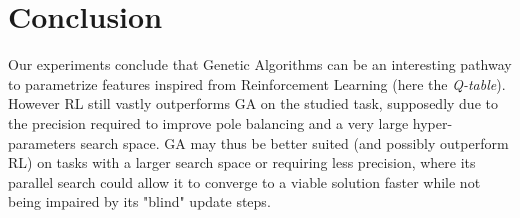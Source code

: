 \section{Conclusion}

Our experiments conclude that Genetic Algorithms can be an interesting pathway to parametrize features inspired from Reinforcement Learning (here the \textit{Q-table}).
However RL still vastly outperforms GA on the studied task, supposedly due to the precision required to improve pole balancing and a very large hyper-parameters search space.
GA may thus be better suited (and possibly outperform RL) on tasks with a larger search space or requiring less precision, where its parallel search could allow it to converge to a viable solution faster while not being impaired by its "blind" update steps.


